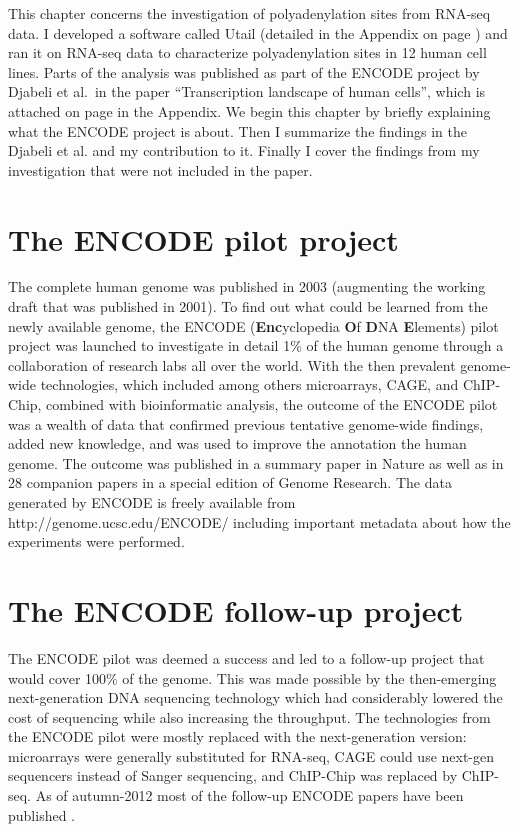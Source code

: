 %

This chapter concerns the investigation of polyadenylation sites from RNA-seq
data. I developed a software called Utail (detailed in the Appendix on page
\pageref{utail}) and ran it on RNA-seq data to characterize polyadenylation
sites in 12 human cell lines. Parts of the analysis was published as part of
the ENCODE project by Djabeli et al.\ in the paper ``Transcription landscape of
human cells'', which is attached on page \pageref{landscape} in the Appendix.
We begin this chapter by briefly explaining what the ENCODE project is about.
Then I summarize the findings in the Djabeli et al. and my contribution to it.
Finally I cover the findings from my investigation that were not included in
the paper.

\section{The ENCODE pilot project}
The complete human genome was published in 2003 (augmenting the working draft
that was published in 2001). To find out what could be learned from the newly
available genome, the ENCODE (\textbf{Enc}yclopedia \textbf{O}f \textbf{D}NA
\textbf{E}lements) pilot project was launched to investigate in detail 1\% of
the human genome through a collaboration of research labs all over the world.
With the then prevalent genome-wide technologies, which included among others
microarrays, CAGE, and ChIP-Chip, combined with bioinformatic analysis, the
outcome of the ENCODE pilot was a wealth of data that confirmed previous
tentative genome-wide findings, added new knowledge, and was used to improve
the annotation the human genome. The outcome was published in a summary paper
in Nature \cite{birney_identification_2007} as well as in 28 companion papers
in a special edition of Genome Research. The data generated by ENCODE is freely
available from http://genome.ucsc.edu/ENCODE/ including important metadata
about how the experiments were performed.

\section{The ENCODE follow-up project}
The ENCODE pilot was deemed a success and led to a follow-up project that would
cover 100\% of the genome. This was made possible by the then-emerging
next-generation DNA sequencing technology which had considerably lowered the
cost of sequencing while also increasing the throughput. The technologies from
the ENCODE pilot were mostly replaced with the next-generation version:
microarrays were generally substituted for RNA-seq, CAGE could use next-gen
sequencers instead of Sanger sequencing, and ChIP-Chip was replaced by
ChIP-seq. As of autumn-2012 most of the follow-up ENCODE papers have been
published \cite{consortium_integrated_2012}.

